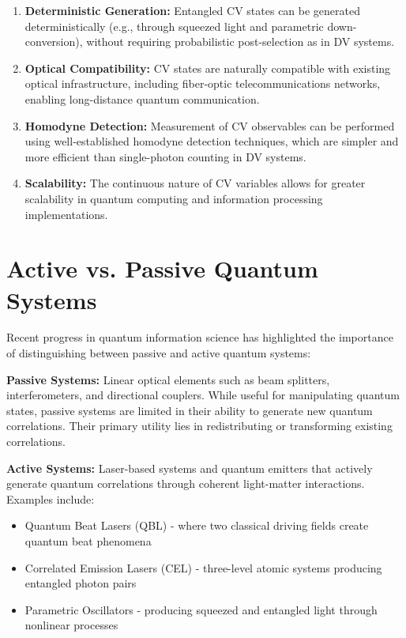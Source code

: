 \begin{enumerate}
	\item \textbf{Deterministic Generation:} Entangled CV states can be generated deterministically (e.g., through squeezed light and parametric down-conversion), without requiring probabilistic post-selection as in DV systems.

	\item \textbf{Optical Compatibility:} CV states are naturally compatible with existing optical infrastructure, including fiber-optic telecommunications networks, enabling long-distance quantum communication.

	\item \textbf{Homodyne Detection:} Measurement of CV observables can be performed using well-established homodyne detection techniques, which are simpler and more efficient than single-photon counting in DV systems.

	\item \textbf{Scalability:} The continuous nature of CV variables allows for greater scalability in quantum computing and information processing implementations.
\end{enumerate}

\section{Active vs. Passive Quantum Systems}

Recent progress in quantum information science has highlighted the importance of distinguishing between passive and active quantum systems:

\textbf{Passive Systems:} Linear optical elements such as beam splitters, interferometers, and directional couplers. While useful for manipulating quantum states, passive systems are limited in their ability to generate new quantum correlations. Their primary utility lies in redistributing or transforming existing correlations.

\textbf{Active Systems:} Laser-based systems and quantum emitters that actively generate quantum correlations through coherent light-matter interactions. Examples include:
\begin{itemize}
	\item Quantum Beat Lasers (QBL) - where two classical driving fields create quantum beat phenomena
	\item Correlated Emission Lasers (CEL) - three-level atomic systems producing entangled photon pairs
	\item Parametric Oscillators - producing squeezed and entangled light through nonlinear processes
\end{itemize}

